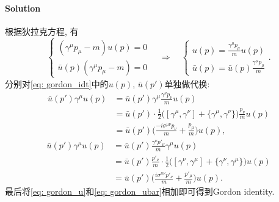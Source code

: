 \paragraph*{Solution} 根据狄拉克方程, 有
\begin{equation*}
  \left\{
  \begin{array}{c}
    (\gamma^\mu p_\mu - m)u(p) = 0 \\
    \bar{u}(p)(\gamma^\mu p_\mu - m) = 0
  \end{array}
  \right.
  \quad\Rightarrow\quad
  \left\{
  \begin{array}{c}
    u(p) = \frac{\gamma^\mu p_\mu}{m}u(p) \\
    \bar{u}(p) = \bar{u}(p)\frac{\gamma^\mu p_\mu}{m}
  \end{array}
  \right..
\end{equation*}
分别对\eqref{eq: gordon_idt}中的$u(p)$, $\bar{u}(p')$单独做代换:
\begin{equation}\label{eq: gordon_u}
  \begin{aligned}
    \bar{u}(p')\gamma^\mu u(p) & = \bar{u}(p')\gamma^\mu \frac{\gamma^\nu p_\nu}{m}u(p) \\
                               & = \bar{u}(p')\cdot\frac{1}{2}\biggl([\gamma^\mu, \gamma^\nu] + \{\gamma^\mu, \gamma^\nu\}\biggr) \frac{p_\nu}{m}u(p) \\
                               & = \bar{u}(p')\biggl(\frac{-i\sigma^{\mu\nu}p_\nu}{m} + \frac{p_\mu}{m}\biggr)u(p),
  \end{aligned}
\end{equation}
\begin{equation}\label{eq: gordon_ubar}
  \begin{aligned}
    \bar{u}(p')\gamma^\mu u(p) & = \bar{u}(p')\frac{\gamma^\nu p'_\nu}{m}\gamma^\mu u(p) \\
                               & = \bar{u}(p') \frac{p'_\nu}{m}\cdot\frac{1}{2}\biggl([\gamma^\nu, \gamma^\mu] + \{\gamma^\nu, \gamma^\mu\}\biggr) u(p) \\
                               & = \bar{u}(p')\biggl(\frac{i\sigma^{\mu\nu}p'_\nu}{m} + \frac{p'_\mu}{m}\biggr)u(p).
  \end{aligned}
\end{equation}
最后将\eqref{eq: gordon_u}和\eqref{eq: gordon_ubar}相加即可得到Gordon identity.